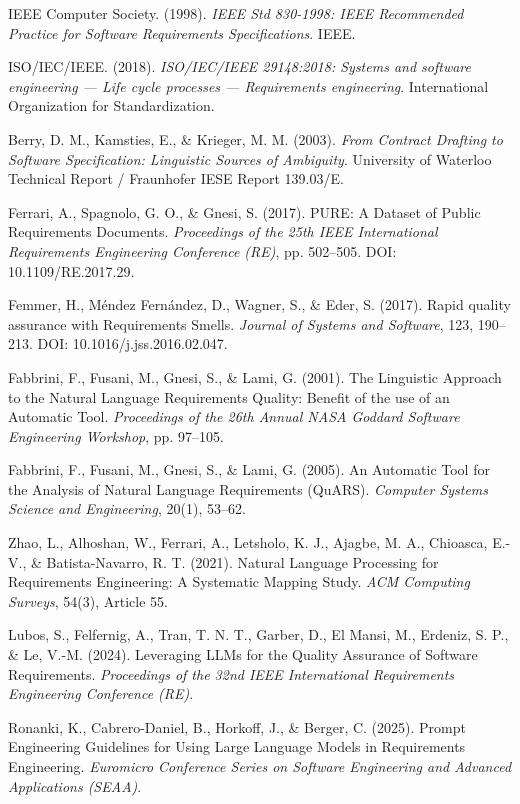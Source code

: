 \documentclass[12pt,a4paper]{report}
\begin{document}
\begin{enumerate}[leftmargin=2.2em,label={[\arabic*]}]
  IEEE Computer Society. (1998). \textit{IEEE Std 830-1998: IEEE Recommended Practice for Software Requirements Specifications}. IEEE.

  ISO/IEC/IEEE. (2018). \textit{ISO/IEC/IEEE 29148:2018: Systems and software engineering --- Life cycle processes --- Requirements engineering}. International Organization for Standardization.

  Berry, D. M., Kamsties, E., \& Krieger, M. M. (2003). \textit{From Contract Drafting to Software Specification: Linguistic Sources of Ambiguity}. University of Waterloo Technical Report / Fraunhofer IESE Report 139.03/E.

  Ferrari, A., Spagnolo, G. O., \& Gnesi, S. (2017). PURE: A Dataset of Public Requirements Documents. \textit{Proceedings of the 25th IEEE International Requirements Engineering Conference (RE)}, pp. 502--505. DOI: 10.1109/RE.2017.29.

  Femmer, H., Méndez Fernández, D., Wagner, S., \& Eder, S. (2017). Rapid quality assurance with Requirements Smells. \textit{Journal of Systems and Software}, 123, 190--213. DOI: 10.1016/j.jss.2016.02.047.

  Fabbrini, F., Fusani, M., Gnesi, S., \& Lami, G. (2001). The Linguistic Approach to the Natural Language Requirements Quality: Benefit of the use of an Automatic Tool. \textit{Proceedings of the 26th Annual NASA Goddard Software Engineering Workshop}, pp. 97--105.

  Fabbrini, F., Fusani, M., Gnesi, S., \& Lami, G. (2005). An Automatic Tool for the Analysis of Natural Language Requirements (QuARS). \textit{Computer Systems Science and Engineering}, 20(1), 53--62.

  Zhao, L., Alhoshan, W., Ferrari, A., Letsholo, K. J., Ajagbe, M. A., Chioasca, E.-V., \& Batista-Navarro, R. T. (2021). Natural Language Processing for Requirements Engineering: A Systematic Mapping Study. \textit{ACM Computing Surveys}, 54(3), Article 55.

  Lubos, S., Felfernig, A., Tran, T. N. T., Garber, D., El Mansi, M., Erdeniz, S. P., \& Le, V.-M. (2024). Leveraging LLMs for the Quality Assurance of Software Requirements. \textit{Proceedings of the 32nd IEEE International Requirements Engineering Conference (RE)}.

  Ronanki, K., Cabrero-Daniel, B., Horkoff, J., \& Berger, C. (2025). Prompt Engineering Guidelines for Using Large Language Models in Requirements Engineering. \textit{Euromicro Conference Series on Software Engineering and Advanced Applications (SEAA)}.
\end{enumerate}
\end{document}
